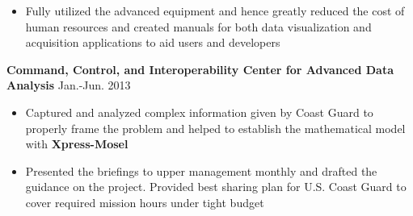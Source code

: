 \documentclass[10.5pt]{res} %
\begin{document}
\begin{resume}
\begin{itemize}
            \item Fully utilized the advanced equipment and hence greatly reduced the cost of human resources and created manuals for both data visualization and acquisition applications to aid users and developers
        \end{itemize}
    \textbf{Command, Control, and Interoperability Center for Advanced Data Analysis}  \hfill Jan.-Jun. 2013
        \begin{itemize}\itemsep -1pt
            \item Captured and analyzed complex information given by Coast Guard to properly frame the problem and helped to establish the mathematical model with \textbf{Xpress-Mosel}%
            \item Presented the briefings to upper management monthly and drafted the guidance on the project. Provided best sharing plan for U.S. Coast Guard to cover required mission hours under tight budget
        \end{itemize}

\end{resume}
\end{document}
